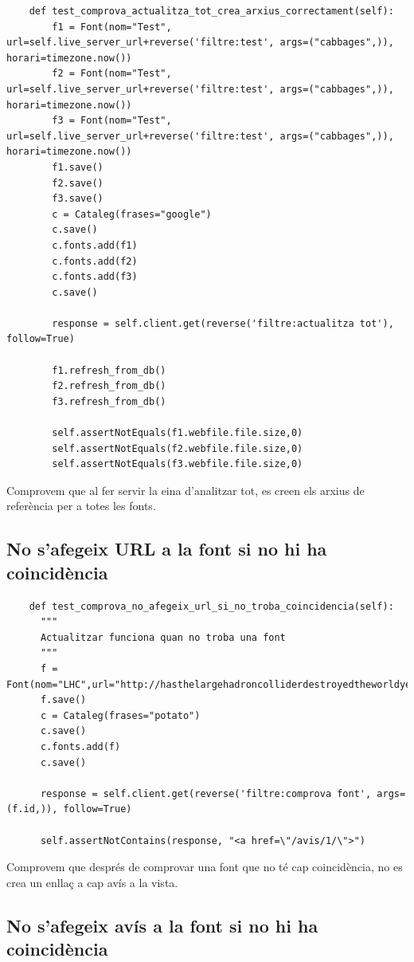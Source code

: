 \documentclass{article}
\begin{document}
\begin{lstlisting}
    def test_comprova_actualitza_tot_crea_arxius_correctament(self):
        f1 = Font(nom="Test", url=self.live_server_url+reverse('filtre:test', args=("cabbages",)), horari=timezone.now())
        f2 = Font(nom="Test", url=self.live_server_url+reverse('filtre:test', args=("cabbages",)), horari=timezone.now())
        f3 = Font(nom="Test", url=self.live_server_url+reverse('filtre:test', args=("cabbages",)), horari=timezone.now())
        f1.save()
        f2.save()
        f3.save()
        c = Cataleg(frases="google")
        c.save()
        c.fonts.add(f1)
        c.fonts.add(f2)
        c.fonts.add(f3)
        c.save()

        response = self.client.get(reverse('filtre:actualitza tot'), follow=True)

        f1.refresh_from_db()
        f2.refresh_from_db()
        f3.refresh_from_db()

        self.assertNotEquals(f1.webfile.file.size,0)
        self.assertNotEquals(f2.webfile.file.size,0)
        self.assertNotEquals(f3.webfile.file.size,0)
\end{lstlisting}

Comprovem que al fer servir la eina d'analitzar tot, es creen els arxius de referència per a totes les fonts.

\subsection{No s'afegeix URL a la font si no hi ha coincidència}

\begin{lstlisting}
    def test_comprova_no_afegeix_url_si_no_troba_coincidencia(self):
      """
      Actualitzar funciona quan no troba una font
      """
      f = Font(nom="LHC",url="http://hasthelargehadroncolliderdestroyedtheworldyet.com/",horari=timezone.now())
      f.save()
      c = Cataleg(frases="potato")
      c.save()
      c.fonts.add(f)
      c.save()

      response = self.client.get(reverse('filtre:comprova font', args=(f.id,)), follow=True)

      self.assertNotContains(response, "<a href=\"/avis/1/\">")
\end{lstlisting}

Comprovem que després de comprovar una font que no té cap coincidència, no es crea un enllaç a cap avís a la vista.

\subsection{No s'afegeix avís a la font si no hi ha coincidència}
\end{document}
